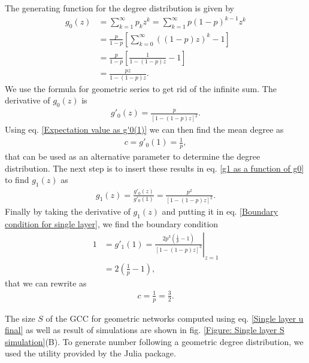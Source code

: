 \documentclass[
11pt, %
english, %
singlespacing, %
nolistspacing, %
liststotoc, %
headsepline, %
]{MastersDoctoralThesis} %
\begin{document}
The generating function for the degree distribution is given by
\begin{align}
	g_0(z) &= \sum_{k = 1}^\infty p_k z^k = \sum_{k=1}^\infty p (1-p)^{k-1} z^k \\
		&= \frac{p}{1 - p} \left[ \sum_{k = 0}^\infty \left((1-p) z\right)^k - 1\right] \\
		&= \frac{p}{1 - p} \left[\frac{1}{1 - (1 - p)z} - 1 \right]\\
		&= \frac{p z}{1 - (1 - p)z}.
\end{align}
We use the formula for geometric series to get rid of the infinite sum. The derivative of $g_0(z)$ is
\begin{align}
	g'_0(z) = \frac{p}{\left[1 - (1 - p)z\right]^2}.
\end{align}
Using eq. \eqref{Expectation value as g'0(1)} we can then find the mean degree as
\begin{align}
	c = g'_0(1) = \frac{1}{p},
\end{align}
that can be used as an alternative parameter to determine the degree distribution. The next step is to insert these results in eq. \eqref{g1 as a function of g0} to find $g_1(z)$ as
\begin{align}
	g_1(z) = \frac{g'_0(z)}{g'_0(1)} = \frac{p^2}{\left[1 - (1 - p)z\right]^2}.
\end{align}
Finally by taking the derivative of $g_1(z)$ and putting it in eq. \eqref{Boundary condition for single layer}, we find the boundary condition
\begin{align}
	1 &= g'_1(1) = \left. \frac{2 p^3 \left(\frac{1}{p} - 1\right)}{\left[1 - (1 - p)z\right]^3}\right\rvert_{z = 1} \\
		&= 2 \left(\frac{1}{p} - 1\right),
\end{align}
that we can rewrite as
\begin{align}
	c = \frac{1}{p} = \frac{3}{2}.
\end{align}

The size $S$ of the GCC for geometric networks computed using eq. \eqref{Single layer u final} as well as result of simulations are shown in fig. \ref{Figure: Single layer S simulation}(B). To generate number following a geometric degree distribution, we used the utility provided by the  Julia package.
\end{document}
